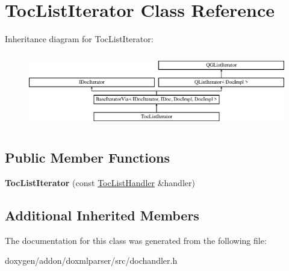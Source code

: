 \hypertarget{class_toc_list_iterator}{}\section{Toc\+List\+Iterator Class Reference}
\label{class_toc_list_iterator}
Inheritance diagram for Toc\+List\+Iterator\+:\begin{figure}[H]
\begin{center}
\leavevmode
\includegraphics[height=3.294118cm]{class_toc_list_iterator}
\end{center}
\end{figure}
\subsection*{Public Member Functions}
\begin{DoxyCompactItemize}
\item 
\mbox{\label{class_toc_list_iterator_a438d0cd6641210cbf5f2b2ef3d0231d8}} 
{\bfseries Toc\+List\+Iterator} (const \mbox{\hyperlink{class_toc_list_handler}{Toc\+List\+Handler}} \&handler)
\end{DoxyCompactItemize}
\subsection*{Additional Inherited Members}


The documentation for this class was generated from the following file\+:\begin{DoxyCompactItemize}
\item 
doxygen/addon/doxmlparser/src/dochandler.\+h\end{DoxyCompactItemize}
